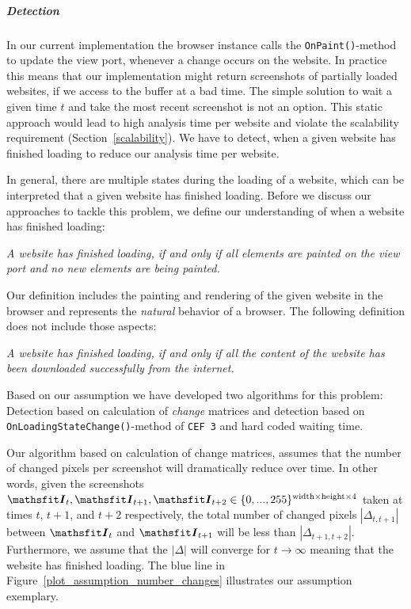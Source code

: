 \subparagraph*{Detection}
\label{datacrawler_detection}
In our current implementation the browser instance calls the \texttt{OnPaint()}-method to update the view port, whenever a change occurs on the website. In practice this means that our implementation might return screenshots of partially loaded websites, if we access to the buffer at a bad time. The simple solution to wait a given time $t$ and take the most recent screenshot is not an option. This static approach would lead to high analysis time per website and violate the scalability requirement (Section~\ref{scalability}). We have to detect, when a given website has finished loading to reduce our analysis time per website.

In general, there are multiple states during the loading of a website, which can be interpreted that a given website has finished loading. Before we discuss our approaches to tackle this problem, we define our understanding of when a website has finished loading:

\begin{center}
	\textit{A website has finished loading, if and only if all elements are painted on the view port and no new elements are being painted.}
\end{center}

Our definition includes the painting and rendering of the given website in the browser and represents the \textit{natural} behavior of a browser. The following definition does not include those aspects:

\begin{center}
	\textit{A website has finished loading, if and only if all the content of the website has been downloaded successfully from the internet.}
\end{center}

Based on our assumption we have developed two algorithms for this problem: Detection based on calculation of \textit{change} matrices and detection based on \texttt{OnLoadingStateChange()}-method of \texttt{CEF 3} and hard coded waiting time.

Our algorithm based on calculation of change matrices, assumes that the number of changed pixels per screenshot will dramatically reduce over time. In other words, given the screenshots $\tens{I}_{t}, \tens{I}_{t+1}, \tens{I}_{t+2}\in \{0, ... , 255\}^{\text{width}\times \text{height} \times 4}$ taken at times $t$, $t+1$,  and $t+2$ respectively, the total number of changed pixels  $|\Delta_{t,t+1}|$ between $\tens{I}_{t}$ and $\tens{I}_{t+1}$ will be less than $|\Delta_{t+1,t+2}|$. Furthermore, we assume that the $|\Delta|$ will converge for $t \rightarrow \infty$ meaning that the website has finished loading. The blue line in Figure~\ref{plot_assumption_number_changes} illustrates our assumption exemplary.


